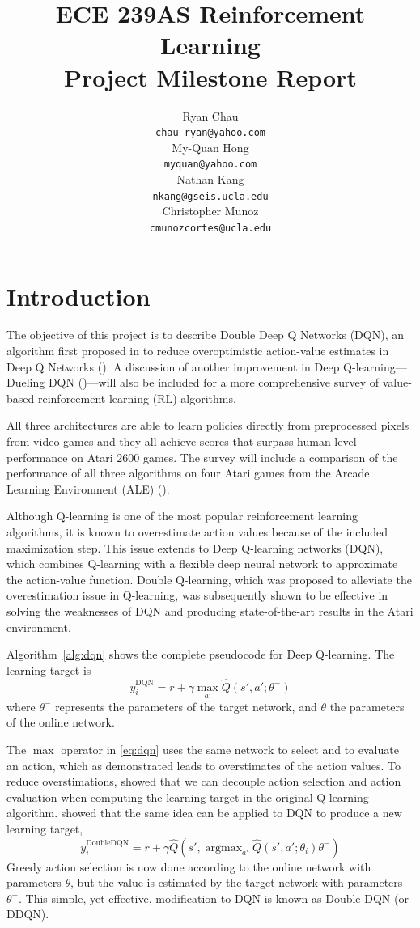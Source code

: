 \documentclass{article}
\title{ECE 239AS Reinforcement Learning\\
       Project Milestone Report}
\author{%
    Ryan Chau \\
    \texttt{chau\_ryan@yahoo.com}\\
    \And
    My-Quan Hong \\
    \texttt{myquan@yahoo.com} \\
    \And
    Nathan Kang \\
    \texttt{nkang@gseis.ucla.edu} \\
    \And
    Christopher Munoz \\
    \texttt{cmunozcortes@ucla.edu} \\
}
\DeclareMathOperator*{\argmax}{argmax}
\begin{document}
\maketitle

\section{Introduction}
The objective of this project is to describe Double Deep Q Networks (DQN), an
algorithm first proposed in \citet{van2016deep} to reduce overoptimistic
action-value estimates in Deep Q Networks (\cite{mnih2015human}). A discussion
of another improvement in Deep Q-learning---Dueling DQN
(\cite{wang2016dueling})---will also be included for a more comprehensive survey
of value-based reinforcement learning (RL) algorithms.

All three architectures are able to learn policies directly from preprocessed
pixels from video games and they all achieve scores that surpass human-level
performance on Atari 2600 games.  The survey will include a comparison of the
performance of all three algorithms on four Atari games from the Arcade Learning
Environment (ALE) (\cite{bellemare2013arcade}).

Although Q-learning is one of the most popular reinforcement learning
algorithms, it is known to overestimate action values because of the included
maximization step. This issue extends to Deep Q-learning networks (DQN), which
combines Q-learning with a flexible deep neural network to approximate the
action-value function. Double Q-learning, which was proposed to alleviate the
overestimation issue in Q-learning, was subsequently shown to be effective in
solving the weaknesses of DQN and producing state-of-the-art results in the
Atari environment.

Algorithm~\ref{alg:dqn} shows the complete pseudocode for Deep Q-learning. The
learning target is
\begin{equation}\label{eq:dqn}
    y_i^{\text{DQN}} = r + \gamma \max_{a'} \hat{Q}(s', a'; \theta^-)    
\end{equation}
where $\theta^-$ represents the parameters of the target network, and $\theta$
the parameters of the online network.

The $\max$ operator in \eqref{eq:dqn} uses the same network to select and to
evaluate an action, which as \cite{van2016deep} demonstrated leads to
overstimates of the action values. To reduce overstimations,
\cite{hasselt2010double} showed that we can decouple action selection and action
evaluation when computing the learning target in the original Q-learning
algorithm. \cite{van2016deep} showed that the same idea can be applied to DQN to
produce a new learning target,
\begin{equation}
    y_i^{\text{DoubleDQN}} = r + \gamma \hat{Q}(s', \argmax_{a'}
    \hat{Q}(s',a';\theta_i) \theta^-)
\end{equation}
Greedy action selection is now done according to the online network with
parameters $\theta$, but the value is estimated by the target network with
parameters $\theta^-$.  This simple, yet effective, modification to DQN is known
as Double DQN (or DDQN). 
\end{document}
